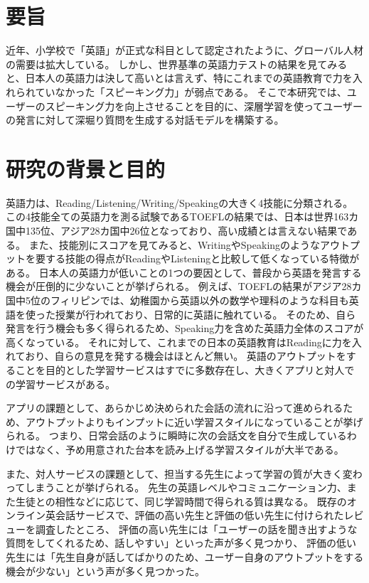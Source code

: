 \documentclass[a4paper,12pt]{jsarticle}
\begin{document}
\begin{framed}
  \section*{要旨}
  近年、小学校で「英語」が正式な科目として認定されたように、グローバル人材の需要は拡大している。
  しかし、世界基準の英語力テストの結果を見てみると、日本人の英語力は決して高いとは言えず、特にこれまでの英語教育で力を入れられていなかった「スピーキング力」が弱点である。
  そこで本研究では、ユーザーのスピーキング力を向上させることを目的に、深層学習を使ってユーザーの発言に対して深堀り質問を生成する対話モデルを構築する。
  
  \section*{研究の背景と目的}
  英語力は、Reading/Listening/Writing/Speakingの大きく4技能に分類される。
  この4技能全ての英語力を測る試験であるTOEFLの結果では、日本は世界163カ国中135位、アジア28カ国中26位となっており、高い成績とは言えない結果である。
  また、技能別にスコアを見てみると、WritingやSpeakingのようなアウトプットを要する技能の得点がReadingやListeningと比較して低くなっている特徴がある。
  日本人の英語力が低いことの1つの要因として、普段から英語を発言する機会が圧倒的に少ないことが挙げられる。
  例えば、TOEFLの結果がアジア28カ国中5位のフィリピンでは、幼稚園から英語以外の数学や理科のような科目も英語を使った授業が行われており、日常的に英語に触れている。
  そのため、自ら発言を行う機会も多く得られるため、Speaking力を含めた英語力全体のスコアが高くなっている。
  それに対して、これまでの日本の英語教育はReadingに力を入れており、自らの意見を発する機会はほとんど無い。
  英語のアウトプットをすることを目的とした学習サービスはすでに多数存在し、大きくアプリと対人での学習サービスがある。

  アプリの課題として、あらかじめ決められた会話の流れに沿って進められるため、アウトプットよりもインプットに近い学習スタイルになっていることが挙げられる。
  つまり、日常会話のように瞬時に次の会話文を自分で生成しているわけではなく、予め用意された台本を読み上げる学習スタイルが大半である。

  また、対人サービスの課題として、担当する先生によって学習の質が大きく変わってしまうことが挙げられる。
  先生の英語レベルやコミュニケーション力、また生徒との相性などに応じて、同じ学習時間で得られる質は異なる。
  既存のオンライン英会話サービスで、評価の高い先生と評価の低い先生に付けられたレビューを調査したところ、
  評価の高い先生には「ユーザーの話を聞き出すような質問をしてくれるため、話しやすい」といった声が多く見つかり、
  評価の低い先生には「先生自身が話してばかりのため、ユーザー自身のアウトプットをする機会が少ない」という声が多く見つかった。


\end{framed}
\end{document}
